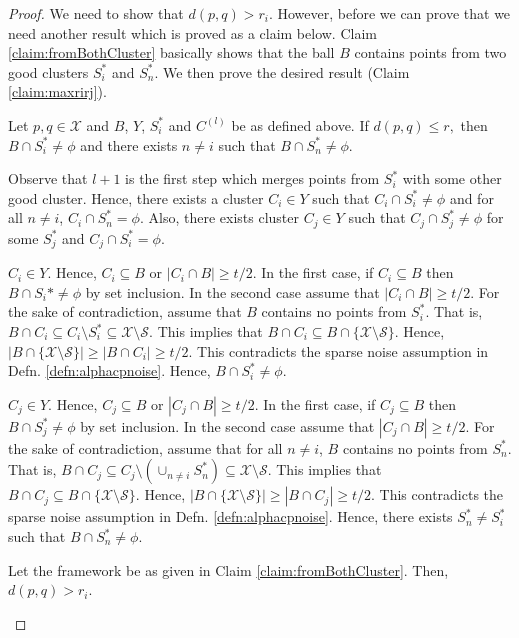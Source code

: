 \documentclass[11pt]{article}
\newcommand{\mc}{\mathcal}
\begin{document}
\begin{proof}
We need to show that $d(p, q) > r_i$. However, before we can prove that we need another result which is proved as a claim below. Claim \ref{claim:fromBothCluster} basically shows that the ball $B$ contains points from two good clusters $S_i^*$ and $S_n^*$. We then prove the desired result (Claim \ref{claim:maxrirj}).
\begin{claim}
\label{claim:fromBothCluster}
Let $p, q \in \mc X$ and $B$, $Y$, $S_i^*$ and $C^{(l)}$ be as defined above. If $d(p, q) \le r,$ then $B \cap S_i^* \neq \phi$ and there exists $n \neq i$ such that $B \cap S_n^* \neq \phi$.
\end{claim}
\vspace{-0.1in} Observe that $l+1$ is the first step which merges points from $S_i^*$ with some other good cluster. Hence, there exists a cluster $C_i \in Y$ such that $C_i\cap S_i^*  \neq \phi$ and for all $n \neq i$, $C_i \cap S_n^* = \phi$. Also, there exists cluster $C_j \in Y$ such that $C_j \cap S_j^* \neq \phi$ for some $S_j^*$ and $C_j \cap S_i^* = \phi$.

$C_i \in Y$. Hence, $C_i \subseteq B$ or $|C_i \cap B| \ge t/2$. In the first case, if $C_i \subseteq B$ then $B \cap S_i* \neq \phi$ by set inclusion. In the second case assume that $|C_i \cap B| \ge t/2$. For the sake of contradiction, assume that $B$ contains no points from $S_i^*$. That is, $B \cap C_i \subseteq C_i \setminus S_i^* \subseteq \mc X \setminus \mc S$. This implies that $B \cap C_i \subseteq B \cap \{\mc X \setminus \mc S\}$. Hence, $|B\cap \{\mc X \setminus \mc S\}| \ge |B \cap C_i| \ge t/2$. This contradicts the sparse noise assumption in Defn. \ref{defn:alphacpnoise}. Hence, $B \cap S_i^* \neq \phi$.

$C_j \in Y$. Hence, $C_j \subseteq B$ or $|C_j \cap B| \ge t/2$. In the first case, if $C_j \subseteq B$ then $B \cap S_j^* \neq \phi$ by set inclusion. In the second case assume that $|C_j \cap B| \ge t/2$. For the sake of contradiction, assume that for all $n \neq i$, $B$ contains no points from $S_n^*$. That is, $B \cap C_j \subseteq C_j \setminus (\cup_{n \neq i} S_n^*) \subseteq \mc X \setminus \mc S$. This implies that $B \cap C_j \subseteq B \cap \{\mc X \setminus \mc S\}$. Hence, $|B\cap \{\mc X \setminus \mc S\}| \ge |B \cap C_j| \ge t/2$. This contradicts the sparse noise assumption in Defn. \ref{defn:alphacpnoise}. Hence, there exists $S_n^* \neq S_i^*$ such that $B \cap S_n^* \neq \phi$.

\begin{claim}
\label{claim:maxrirj}
Let the framework be as given in Claim \ref{claim:fromBothCluster}. Then, $d(p, q) > r_i$.
\end{claim}


\end{proof}
\end{document}
